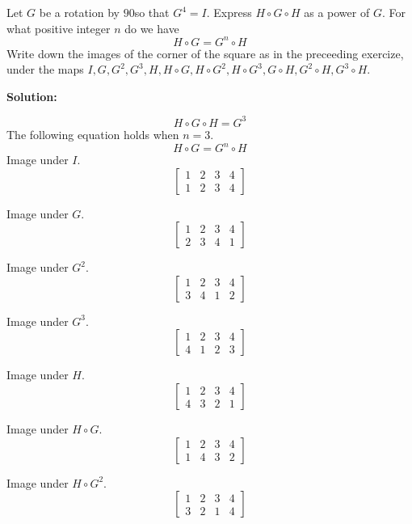 \begin{tcolorbox}[title=Problem 10, breakable]
    Let $G$ be a rotation by $90$\textdegree so that $G^4 = I$.
    Express $H \circ G \circ H$ as a power of $G$.
    For what positive integer $n$ do we have 
    \[H \circ G = G^n \circ H\]
    Write down the images of the corner of the square as in 
    the preceeding exercize, under the maps 
    $I, G, G^2, G^3, H, H \circ G, H \circ G^2, H \circ G^3, G \circ H, G^2 \circ H, G^3 \circ H$.
\end{tcolorbox}

\textbf{Solution:}

\[H \circ G \circ H = G^3\]
The following equation holds when $n = 3$.
\[H \circ G = G^n \circ H\]
Image under $I$.
\[
\begin{bmatrix}
1 & 2 & 3 & 4 \\
1 & 2 & 3 & 4
\end{bmatrix}
\]

Image under $G$.
\[
\begin{bmatrix}
1 & 2 & 3 & 4 \\
2 & 3 & 4 & 1
\end{bmatrix}
\]

Image under $G^2$.
\[
\begin{bmatrix}
1 & 2 & 3 & 4 \\
3 & 4 & 1 & 2
\end{bmatrix}
\]

Image under $G^3$.
\[
\begin{bmatrix}
1 & 2 & 3 & 4 \\
4 & 1 & 2 & 3
\end{bmatrix}
\]

Image under $H$.
\[
\begin{bmatrix}
1 & 2 & 3 & 4 \\
4 & 3 & 2 & 1
\end{bmatrix}
\]

Image under $H \circ G$.
\[
\begin{bmatrix}
1 & 2 & 3 & 4 \\
1 & 4 & 3 & 2
\end{bmatrix}
\]

Image under $H \circ G^2$.
\[
\begin{bmatrix}
1 & 2 & 3 & 4 \\
3 & 2 & 1 & 4
\end{bmatrix}
\]


